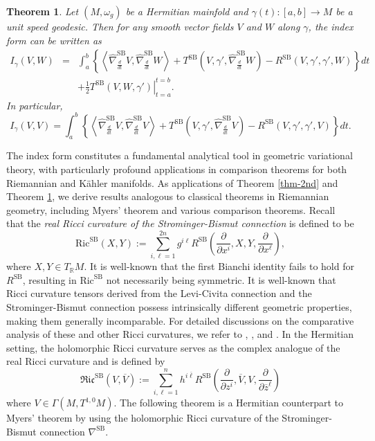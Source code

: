 \documentclass[12pt, reqno]{amsart}
\theoremstyle{plain}
\newtheorem{thm}{Theorem}[section]
\theoremstyle{definition}
\newcommand{\btheorem}{\begin{thm}}
\newcommand{\etheorem}{\end{thm}}
\newcommand{\p}{\partial}
\renewcommand{\bar}{\overline}
\newcommand{\beq}{\begin{equation}}
\newcommand{\eeq}{\end{equation}}
\newcommand{\ee}{\end{eqnarray*}}
\newcommand{\be}{\begin{eqnarray*}}
\renewcommand{\hat}{\widehat}
\renewcommand{\>}{\rightarrow}
\newcommand{\R}{{\mathbb R}}
\newcommand{\LL}{\left\langle}
\newcommand{\RL}{\right\rangle}
\newcommand{\MS}{\mathrm{SB}}
\newcommand{\Ric}{\mathrm{Ric}}
\renewcommand{\>}{\rightarrow}
\renewcommand{\p}{{\partial}}
\numberwithin{equation}{section} %
\begin{document}
    \btheorem\label{thm-index form}     Let $(M,\omega_g)$ be a Hermitian mainfold and $\gamma(t):[a,b]\to M$ be a unit speed geodesic. Then for any smooth vector fields $V$ and $W$ along $\gamma$, the index form can be written as
   \be I_\gamma(V,W)&=&\int_a^b\left\{\LL\hat{\nabla}^{\MS}_{\frac{d}{d t}}V,\hat{\nabla}^{\MS}_{\frac{d}{d t}}W\RL+T^{\MS}\left(V,\gamma',\hat{\nabla}^{\MS}_{\frac{d}{d t}}W\right)-R^{\MS}(V,\gamma',\gamma',W)\right\}dt\\
   &&+\left.\frac{1}{2}T^\MS(V,W,\gamma')\right|_{t=a}^{t=b}.\ee
   In particular,
   \beq I_\gamma(V,V)=\int_a^b\left\{\LL\hat{\nabla}^{\MS}_{\frac{d}{d t}}V,\hat{\nabla}^{\MS}_{\frac{d}{d t}}V\RL+T^{\MS}\left(V,\gamma',\hat{\nabla}^{\MS}_{\frac{d}{d t}}V\right)-R^{\MS}(V,\gamma',\gamma',V)\right\}dt.\eeq
   \etheorem

   \noindent The index form constitutes a fundamental analytical tool in geometric variational theory, with particularly profound applications in comparison theorems for both Riemannian and K\"ahler manifolds. As applications of Theorem \ref{thm-2nd} and Theorem \ref{thm-index form}, we derive results analogous to classical theorems in Riemannian geometry, including Myers’ theorem and various comparison theorems. Recall that
   the \emph{real Ricci curvature of the Strominger-Bismut connection} is defined to be
   \beq
   \Ric^{\MS}(X,Y):=\sum_{i,\ell=1}^{2n}g^{i\ell} R^{\MS}\left(\frac{\p}{\p x^i},X,Y,\frac{\p}{\p x^\ell}\right), \label{realSB}
   \eeq
   where  $X,Y\in T_\R M$.
    It is well-known that the first Bianchi identity fails to hold for  $R^\MS$, resulting in  $ \Ric^{\MS}$
    not necessarily being symmetric.  It is well-known that  Ricci curvature tensors derived from the Levi-Civita connection and the Strominger-Bismut connection possess intrinsically different geometric properties, making them generally incomparable. For detailed discussions on the comparative analysis of these and other Ricci curvatures, we refer to \cite{LY12}, \cite{LY16}, and \cite{WY25}.
     In the Hermitian setting,  the holomorphic Ricci curvature serves as the complex analogue of the real Ricci curvature and is defined by  \beq   \mathfrak{Ric}^\MS(V,\bar V):=\sum_{i,\ell=1}^nh^{i\bar\ell}R^\MS\left(\frac{\p}{\p z^i},
    \bar V, V, \frac{\p}{\p {{\bar z}^\ell}}\right)\eeq 
    where $V\in\Gamma(M,T^{1,0}M)$.  The following theorem is a Hermitian counterpart to Myers' theorem by using the holomorphic  Ricci curvature of the Strominger-Bismut connection $\nabla^\MS$.
\end{document}
